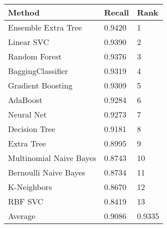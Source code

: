 \begin{tabular}{|l|l|l| }
\hline
Method                  & Recall & Rank \\ \hline
Ensemble Extra Tree     & 0.9420 & 1\\
Linear SVC              & 0.9390 & 2\\
Random Forest           & 0.9376 & 3\\
BaggingClassifier       & 0.9319 & 4\\
Gradient Boosting       & 0.9309 & 5\\
AdaBoost                & 0.9284 & 6\\
Neural Net              & 0.9273 & 7\\
Decision Tree           & 0.9181 & 8\\
Extra Tree              & 0.8995 & 9\\
Multinomial Naive Bayes & 0.8743 & 10\\
Bernoulli Naive Bayes   & 0.8734 & 11\\
K-Neighbors             & 0.8670 & 12\\
RBF SVC                 & 0.8419 & 13\\
Average & 0.9086 & 0.9335 & \\
\hline
\end{tabular}
